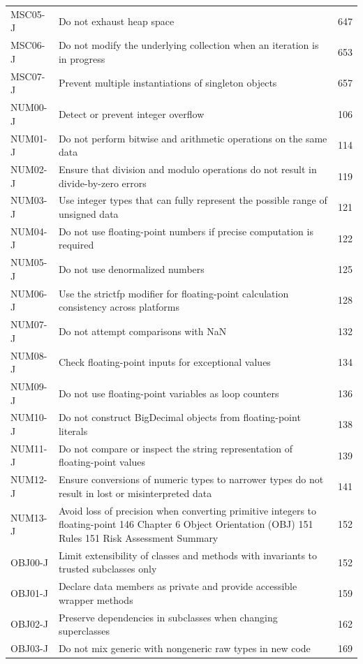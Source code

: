 \documentclass[11pt]{report}
\begin{document}
\begin{longtable}{@{}llr@{}}
MSC05-J & Do not exhaust heap space & 647\\
MSC06-J & Do not modify the underlying collection when an iteration is in progress & 653\\
MSC07-J & Prevent multiple instantiations of singleton objects & 657\\
NUM00-J & Detect or prevent integer overflow & 106\\
NUM01-J & Do not perform bitwise and arithmetic operations on the same data & 114\\
NUM02-J & Ensure that division and modulo operations do not result in divide-by-zero errors & 119\\
NUM03-J & Use integer types that can fully represent the possible range of unsigned data & 121\\
NUM04-J & Do not use floating-point numbers if precise computation is required & 122\\
NUM05-J & Do not use denormalized numbers & 125\\
NUM06-J & Use the strictfp modifier for floating-point calculation consistency across platforms & 128\\
NUM07-J & Do not attempt comparisons with NaN & 132\\
NUM08-J & Check floating-point inputs for exceptional values & 134\\
NUM09-J & Do not use floating-point variables as loop counters & 136\\
NUM10-J & Do not construct BigDecimal objects from floating-point literals & 138\\
NUM11-J & Do not compare or inspect the string representation of floating-point values & 139\\
NUM12-J & Ensure conversions of numeric types to narrower types do not result in lost or misinterpreted data & 141\\
NUM13-J & Avoid loss of precision when converting primitive integers to floating-point 146 Chapter 6 Object Orientation (OBJ) 151 Rules 151 Risk Assessment Summary & 152\\
OBJ00-J & Limit extensibility of classes and methods with invariants to trusted subclasses only & 152\\
OBJ01-J & Declare data members as private and provide accessible wrapper methods & 159\\
OBJ02-J & Preserve dependencies in subclasses when changing superclasses & 162\\
OBJ03-J & Do not mix generic with nongeneric raw types in new code & 169\\

\end{longtable}
\end{document}
